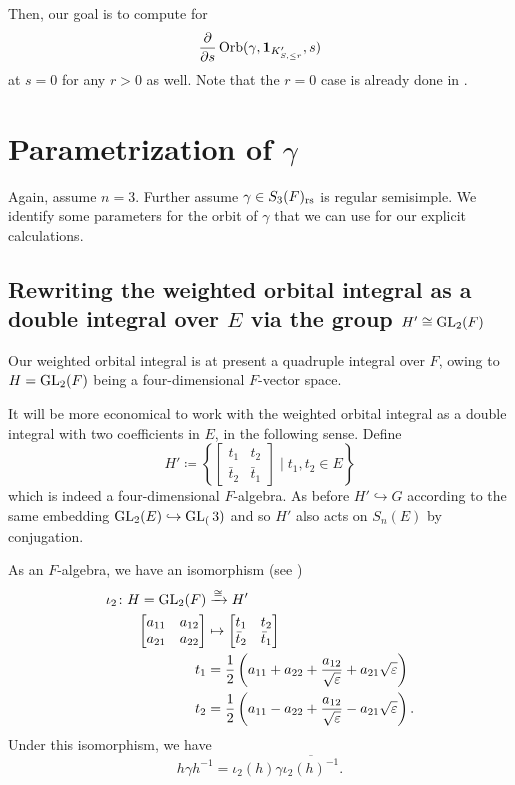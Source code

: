 Then, our goal is to compute for
\begin{equation}
  \pdv{}{s}\operatorname{Orb}(\gamma, \mathbf{1}_{K'_{S, \le r}}, s)
  \label{eq:orbital_goal}
\end{equation}
at $s=0$ for any $r > 0$ as well.
Note that the $r = 0$ case is already done in \cite{ref:AFL}.

\section{Parametrization of $\gamma$}
Again, assume $n = 3$.
Further assume $\gamma \in S_3(F)_{\mathrm{rs}}$ is regular semisimple.
We identify some parameters for the orbit of $\gamma$
that we can use for our explicit calculations.

\subsection{Rewriting the weighted orbital integral as a double integral over $E$
  via the group $H' \cong \operatorname{GL}_2(F)$}
Our weighted orbital integral is at present a quadruple integral over $F$,
owing to $H = \operatorname{GL}_{2}(F)$ being a four-dimensional $F$-vector space.

It will be more economical to work with the weighted orbital integral as a double integral
with two coefficients in $E$, in the following sense.
Define
\[ H' \coloneqq
  \left\{ \begin{bmatrix} t_1 & t_2 \\ \bar t_2 & \bar t_1 \end{bmatrix}
    \mid t_1, t_2 \in E \right\}
\]
which is indeed a four-dimensional $F$-algebra.
As before $H' \hookrightarrow G$ according to the same embedding
$\operatorname{GL}_2(E) \hookrightarrow \operatorname{GL}_(3)$
and so $H'$ also acts on $S_n(E)$ by conjugation.

As an $F$-algebra, we have an isomorphism (see \cite[\S4.1]{ref:AFL})
\begin{align*}
  \iota_2 \colon H = \operatorname{GL}_2(F)
  &\xrightarrow{\cong} H' \\
  \begin{bmatrix} a_{11} & a_{12} \\ a_{21} & a_{22} \end{bmatrix}
  &\mapsto \begin{bmatrix} t_1 & t_2 \\ \bar t_2 & \bar t_1 \end{bmatrix} \\
  t_1 &= \frac{1}{2}\left( a_{11} + a_{22} + \frac{a_{12}}{\sqrt{\varepsilon}} + a_{21} \sqrt{\varepsilon} \right) \\
  t_2 &= \frac{1}{2}\left( a_{11} - a_{22} + \frac{a_{12}}{\sqrt{\varepsilon}} - a_{21} \sqrt{\varepsilon} \right).
\end{align*}
Under this isomorphism, we have
\[ h \gamma h^{-1} = \iota_2(h) \gamma \overline{\iota_2(h)^{-1}}. \]

